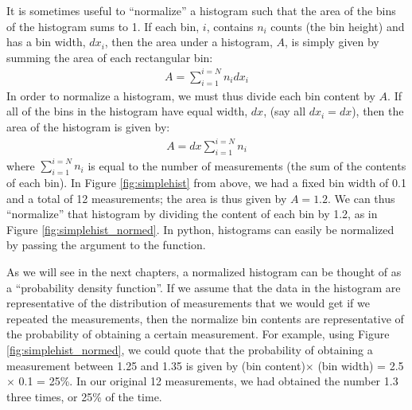 It is sometimes useful to ``normalize'' a histogram such that the area of the bins of the histogram sums to 1. If each bin, $i$, contains $n_i$ counts (the bin height) and has a bin width, $dx_i$, then the area under a histogram, $A$, is simply given by summing the area of each rectangular bin:
\begin{align}
A = \sum_{i=1}^{i=N}n_idx_i
\end{align}
In order to normalize a histogram, we must thus divide each bin content by $A$. If all of the bins in the histogram have equal width, $dx$, (say all $dx_i=dx$), then the area of the histogram is given by:
\begin{align}
A = dx\sum_{i=1}^{i=N}n_i
\end{align}
where $\sum_{i=1}^{i=N}n_i$ is equal to the number of measurements (the sum of the contents of each bin). In Figure \ref{fig:simplehist} from above, we had a fixed bin width of 0.1 and a total of 12 measurements; the area is thus given by $A=1.2$. We can thus ``normalize'' that histogram by dividing the content of each bin by 1.2, as in Figure \ref{fig:simplehist_normed}. In python, histograms can easily be normalized by passing the argument  to the  function. 


As we will see in the next chapters, a normalized histogram can be thought of as a ``probability density function''. If we assume that the data in the histogram are representative of the distribution of measurements that we would get if we repeated the measurements, then the normalize bin contents are representative of the probability of obtaining a certain measurement. For example, using Figure \ref{fig:simplehist_normed}, we could quote that the probability of obtaining a measurement between 1.25 and 1.35 is given by (bin content)$\times$ (bin width) = 2.5 $\times$ 0.1 = 25\%. In our original 12 measurements, we had obtained the number 1.3 three times, or 25\% of the time.

